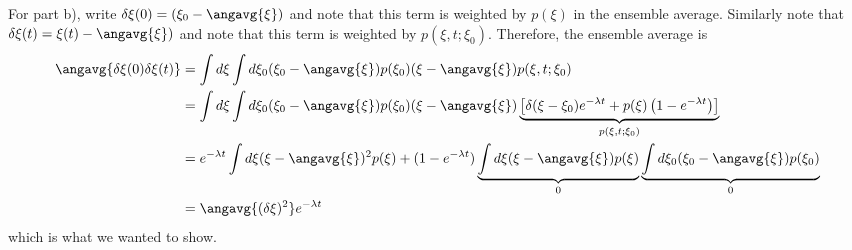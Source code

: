 For part b), write $\delta \xi(0) = (\xi_0 - \angavg{\xi})$ and note that this term is weighted by $p(\xi)$ in the ensemble average.
Similarly note that $\delta \xi(t) = \xi(t) - \angavg{\xi})$ and note that this term is weighted by $p(\xi, t; \xi_0)$.
Therefore, the ensemble average is
\begin{align*}
	\angavg{\delta \xi(0) \delta \xi(t)}
	&= \int d\xi \int d\xi_0 (\xi_0 - \angavg{\xi}) p(\xi_0) (\xi - \angavg{\xi}) p(\xi, t; \xi_0) \\
	&= \int d\xi \int d\xi_0 (\xi_0 - \angavg{\xi}) p(\xi_0) (\xi - \angavg{\xi})
	\underbrace{\left[ \delta(\xi - \xi_0) e^{-\lambda t} + p(\xi) \left( 1 - e^{-\lambda t} \right) \right]}_{p(\xi, t; \xi_0)} \\
	&= e^{-\lambda t} \int d\xi (\xi - \angavg{\xi})^2 p(\xi) + (1 - e^{-\lambda t})
	\underbrace{\int d\xi (\xi - \angavg{\xi}) p(\xi)}_0
	\underbrace{\int d\xi_0 (\xi_0 - \angavg{\xi}) p(\xi_0)}_0 \\
	&= \angavg{(\delta \xi)^2} e^{-\lambda t}
\end{align*}
which is what we wanted to show.
